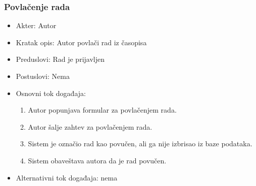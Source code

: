 \documentclass[a4paper]{article}
\begin{document}
\subsubsection{Povlačenje rada}
\label{subsubsection:povlacenjerada}
\begin{itemize}
    \item Akter: Autor
    \item Kratak opis: Autor povlači rad iz časopisa
    \item Preduslovi: Rad je prijavljen
    \item Postuslovi: Nema
    \item Osnovni tok događaja:
        \begin{enumerate}
           \item Autor popunjava formular za povlačenjem rada.
           \item Autor šalje zahtev za povlačenjem rada.
           \item Sistem je označio rad kao povučen, ali ga nije izbrisao iz baze podataka.
           \item Sistem obaveštava autora da je rad povučen.
        \end{enumerate}
    \item Alternativni tok događaja: nema
\end{itemize}

\newpage
\end{document}
